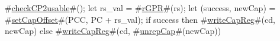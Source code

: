 #\hyperref[sailMIPSzcheckCP2usable]{checkCP2usable}#();
let rs_val = #\hyperref[sailMIPSzrGPR]{rGPR}#(rs);
let (success, newCap) = #\hyperref[sailMIPSzsetCapOffset]{setCapOffset}#(PCC, PC + rs_val);
if success then
    #\hyperref[sailMIPSzwriteCapReg]{writeCapReg}#(cd, newCap)
else
    #\hyperref[sailMIPSzwriteCapReg]{writeCapReg}#(cd, #\hyperref[sailMIPSzunrepCap]{unrepCap}#(newCap))
